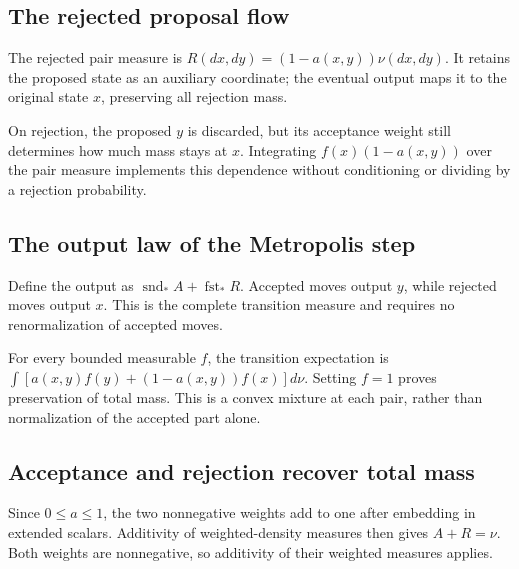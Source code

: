 \documentclass[11pt,a4paper]{report}
\begin{document}
\subsection{\texorpdfstring{The rejected proposal flow}{The rejected proposal flow}}
\label{report-step-UnadjustedLangevin-Metropolis-lean-2}


The rejected pair measure is \(R(dx,dy)=(1-a(x,y))\nu(dx,dy)\). It retains the proposed state as an auxiliary coordinate; the eventual output maps it to the original state \(x\), preserving all rejection mass.



On rejection, the proposed \(y\) is discarded, but its acceptance weight still determines how much mass stays at \(x\). Integrating \(f(x)(1-a(x,y))\) over the pair measure implements this dependence without conditioning or dividing by a rejection probability.

\subsection{\texorpdfstring{The output law of the Metropolis step}{The output law of the Metropolis step}}
\label{report-step-UnadjustedLangevin-Metropolis-lean-3}


Define the output as \(\operatorname{snd}_*A+\operatorname{fst}_*R\). Accepted moves output \(y\), while rejected moves output \(x\). This is the complete transition measure and requires no renormalization of accepted moves.



For every bounded measurable \(f\), the transition expectation is \(\int[a(x,y)f(y)+(1-a(x,y))f(x)]d\nu\). Setting \(f=1\) proves preservation of total mass. This is a convex mixture at each pair, rather than normalization of the accepted part alone.

\subsection{\texorpdfstring{Acceptance and rejection recover total mass}{Acceptance and rejection recover total mass}}
\label{report-step-UnadjustedLangevin-Metropolis-lean-4}


Since \(0\le a\le1\), the two nonnegative weights add to one after embedding in extended scalars. Additivity of weighted-density measures then gives \(A+R=\nu\). Both weights are nonnegative, so additivity of their weighted measures applies.
\end{document}
